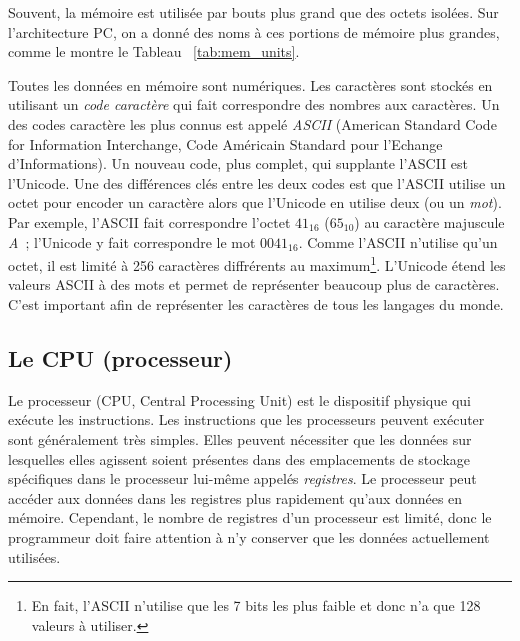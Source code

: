Souvent, la mémoire est utilisée par bouts plus grand que des octets isolées.
Sur l'architecture PC, on a donné des noms à ces portions de mémoire plus
grandes, comme le montre le Tableau ~\ref{tab:mem_units}.

Toutes les données en mémoire sont numériques. Les caractères sont stockés en
utilisant un \emph{code caractère} qui fait correspondre des nombres aux caractères.
Un des codes caractère les plus connus est appelé \emph{ASCII} (American
Standard Code for Information Interchange, Code Américain Standard pour l'Echange
d'Informations). Un nouveau code, plus complet, qui supplante l'ASCII est l'Unicode.
Une des différences clés entre les deux codes est que l'ASCII utilise un octet
pour encoder un caractère alors que l'Unicode en utilise deux (ou un \emph{mot}).
Par exemple, l'ASCII fait correspondre l'octet $41_{16}$ ($65_{10}$) au caractère
majuscule \emph{A}~; l'Unicode y fait correspondre le mot $0041_{16}$. Comme
l'ASCII n'utilise qu'un octet, il est limité à 256 caractères diffrérents au 
maximum\footnote{En fait, l'ASCII n'utilise que les 7 bits les plus faible et
donc n'a que 128 valeurs à utiliser.}. L'Unicode étend les valeurs ASCII
à des mots et permet de représenter beaucoup plus de caractères. C'est important
afin de représenter les caractères de tous les langages du monde.

\subsection{Le CPU (processeur)}

Le processeur (CPU, Central Processing Unit) est le dispositif physique qui
exécute les instructions. Les instructions que les processeurs peuvent exécuter
sont généralement très simples. Elles peuvent nécessiter que les
données sur lesquelles elles agissent soient présentes dans des emplacements
de stockage spécifiques dans le processeur lui-même appelés \emph{registres}. 
Le processeur peut accéder aux données dans les registres plus rapidement qu'aux
données en mémoire. Cependant, le nombre de registres d'un processeur est limité,
donc le programmeur doit faire attention à n'y conserver que les données
actuellement utilisées.


